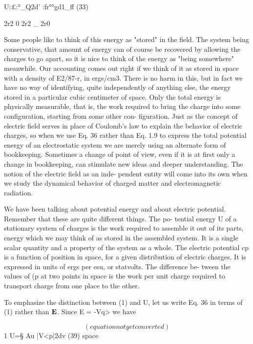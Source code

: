 U:£:°_Q2d' :fr°°gd1_ff (33)

2r2 0 2r2 _ 2r0

 

Some people like to think of this energy as "stored" in the field.
The system being conservative, that amount of energy can of course
be recovered by allowing the charges to go apart, so it is nice to think
of the energy as "being somewhere" meanwhile. Our accounting
comes out right if we think of it as stored in space with a density of
E2/87-r, in ergs/cm3. There is no harm in this, but in fact we have no
way of identifying, quite independently of anything else, the energy
stored in a particular cubic centimeter of space. Only the total
energy is physically measurable, that is, the work required to bring
the charge into some configuration, starting from some other con-
figuration. Just as the concept of electric field serves in place of
Coulomb's law to explain the behavior of electric charges, so when
we use Eq. 36 rather than Eq. 1.9 to express the total potential energy
of an electrostatic system we are merely using an alternate form of
bookkeeping. Sometimes a change of point of view, even if it is at
first only a change in bookkeeping, can stimulate new ideas and
deeper understanding. The notion of the electric field as an inde-
pendent entity will come into its own when we study the dynamical
behavior of charged matter and electromagnetic radiation.

We have been talking about potential energy and about electric
potential. Remember that these are quite different things. The po-
tential energy U of a stationary system of charges is the work required
to assemble it out of its parts, energy which we may think of as stored
in the assembled system. It is a single scalar quantity and a property
of the system as a whole. The electric potential cp is a function of
position in space, for a given distribution of electric charges. It is
expressed in units of ergs per esu, or statvolts. The difference be-
tween the values of (p at two points in space is the work per unit
charge required to transport charge from one place to the other.

To emphasize the distinction between (1) and U, let us write Eq. 36
in terms of (1) rather than $\mathbf{E}$. Since E = -Vq> we have

\begin{equation}
(equation not yet converted)
\end{equation}
1
U=§ Au |V<p|2dv (39)
space

